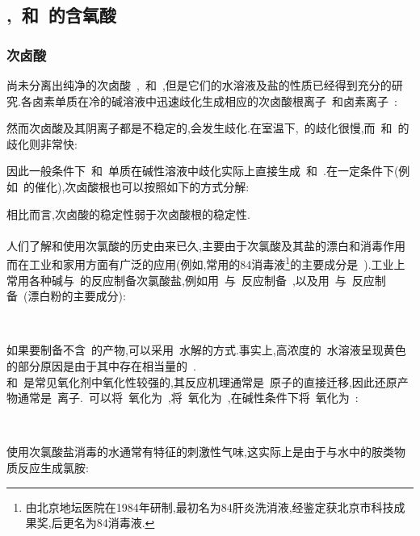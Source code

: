 \documentclass{ctexbook}
\begin{document}
\subsection{,~和~的含氧酸}
\subsubsection{次卤酸~}
尚未分离出纯净的次卤酸~,~和~,但是它们的水溶液及盐的性质已经得到充分的研究.各卤素单质在冷的碱溶液中迅速歧化生成相应的次卤酸根离子~和卤素离子~:
\begin{tightcenter}
\end{tightcenter}
然而次卤酸及其阴离子都是不稳定的,会发生歧化.在室温下,~的歧化很慢,而~和~的歧化则非常快:
\begin{tightcenter}
\end{tightcenter}
因此一般条件下~和~单质在碱性溶液中歧化实际上直接生成~和~.在一定条件下(例如~的催化),次卤酸根也可以按照如下的方式分解:
\begin{tightcenter}
\end{tightcenter}
相比而言,次卤酸的稳定性弱于次卤酸根的稳定性.
\paragraph{}
人们了解和使用次氯酸的历史由来已久,主要由于次氯酸及其盐的漂白和消毒作用而在工业和家用方面有广泛的应用(例如,常用的84消毒液\footnote{由北京地坛医院在1984年研制,最初名为84肝炎洗消液,经鉴定获北京市科技成果奖,后更名为84消毒液.}的主要成分是~).工业上常用各种碱与~的反应制备次氯酸盐,例如用~与~反应制备~,以及用~与~反应制备~(漂白粉的主要成分):
\begin{tightcenter}
    \\
\end{tightcenter}
如果要制备不含~的产物,可以采用~水解的方式.事实上,高浓度的~水溶液呈现黄色的部分原因是由于其中存在相当量的~.\\
\indent {}和~是常见氧化剂中氧化性较强的,其反应机理通常是~原子的直接迁移,因此还原产物通常是~离子.~可以将~氧化为~,将~氧化为~,在碱性条件下将~氧化为~:
\begin{tightcenter}
    \\
    \quad{}
\end{tightcenter}
使用次氯酸盐消毒的水通常有特征的刺激性气味,这实际上是由于与水中的胺类物质反应生成氯胺:
\begin{tightcenter}
\end{tightcenter}
\end{document}
